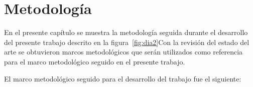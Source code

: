 \pagebreak
\makeatletter
\let\savedchap\@makechapterhead
\def\@makechapterhead{\vspace*{-2.54cm}\savedchap}
\chapter{\vspace{-1cm}Metodología}
\let\@makechapterhead\savedchap
\makeatletter



En el presente capítulo se muestra la metodología seguida durante el desarrollo del presente trabajo descrito en la figura~\ref{fig:dia2}Con la revisión del estado del arte se obtuvieron marcos metodológicos que serán utilizados como referencia para el marco metodológico seguido en el presente trabajo. 



El marco metodológico seguido para el desarrollo del trabajo fue el siguiente: 

